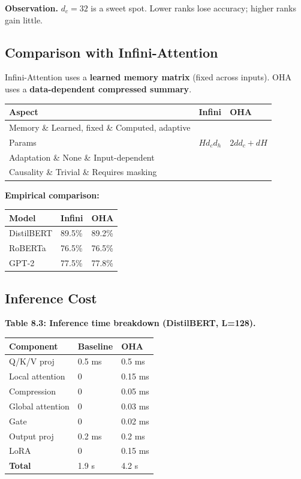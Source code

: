 \textbf{Observation.} $d_c = 32$ is a sweet spot. Lower ranks lose accuracy; 
higher ranks gain little.

\subsection{Comparison with Infini-Attention}

Infini-Attention uses a \textbf{learned memory matrix} (fixed across inputs). 
OHA uses a \textbf{data-dependent compressed summary}.

\begin{table}[H]
\centering
\small
\begin{tabular}{lll}
\toprule
\textbf{Aspect} & \textbf{Infini} & \textbf{OHA} \\
\midrule
Memory \& Learned, fixed \& Computed, adaptive \\
Params & $H d_c d_h$ & $2 d d_c + d H$ \\
Adaptation \& None \& Input-dependent \\
Causality \& Trivial \& Requires masking \\
\bottomrule
\end{tabular}
\end{table}

\textbf{Empirical comparison:}

\begin{table}[H]
\centering
\small
\begin{tabular}{lll}
\toprule
\textbf{Model} & \textbf{Infini} & \textbf{OHA} \\
\midrule
DistilBERT & 89.5\% & 89.2\% \\
RoBERTa & 76.5\% & 76.5\% \\
GPT-2 & 77.5\% & 77.8\% \\
\bottomrule
\end{tabular}
\end{table}

\subsection{Inference Cost}

\textbf{Table 8.3: Inference time breakdown (DistilBERT, L=128).}

\begin{table}[H]
\centering
\small
\begin{tabular}{lll}
\toprule
\textbf{Component} & \textbf{Baseline} & \textbf{OHA} \\
\midrule
Q/K/V proj & 0.5 ms & 0.5 ms \\
Local attention & 0 & 0.15 ms \\
Compression & 0 & 0.05 ms \\
Global attention & 0 & 0.03 ms \\
Gate & 0 & 0.02 ms \\
Output proj & 0.2 ms & 0.2 ms \\
LoRA & 0 & 0.15 ms \\
\textbf{Total} & 1.9 s & 4.2 s \\
\bottomrule
\end{tabular}
\end{table}


